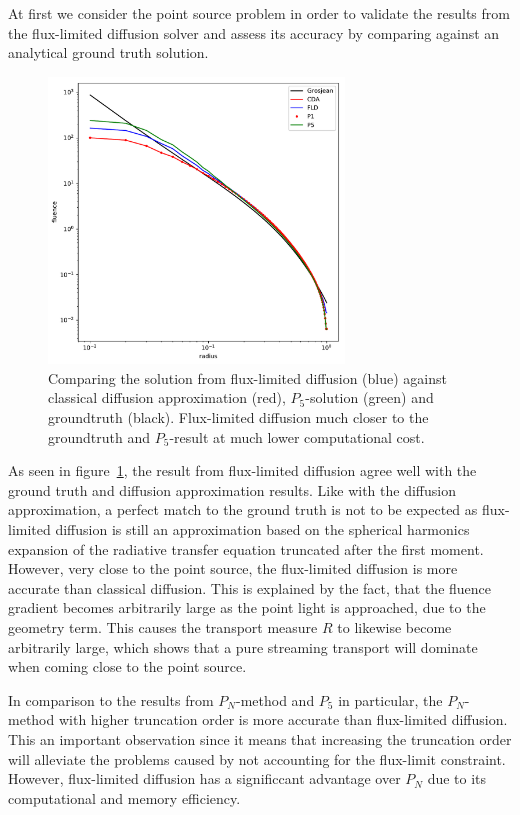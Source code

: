 At first we consider the point source problem in order to validate the results from the flux-limited diffusion solver and assess its accuracy by comparing against an analytical ground truth solution.
\begin{figure}[h]
\centering
\includegraphics[width=0.7\textwidth]{06_fld/results/fld_result_plot_pointsource.pdf}
\caption{Comparing the solution from flux-limited diffusion (blue) against classical diffusion approximation (red), $P_5$-solution (green) and groundtruth (black). Flux-limited diffusion much closer to the groundtruth and $P_5$-result at much lower computational cost.}
\label{fig:fld_results_pointsource_1}
\end{figure}
As seen in figure~\ref{fig:fld_results_pointsource_1}, the result from flux-limited diffusion agree well with the ground truth and diffusion approximation results. Like with the diffusion approximation, a perfect match to the ground truth is not to be expected as flux-limited diffusion is still an approximation based on the spherical harmonics expansion of the radiative transfer equation truncated after the first moment. However, very close to the point source, the flux-limited diffusion is more accurate than classical diffusion. This is explained by the fact, that the fluence gradient becomes arbitrarily large as the point light is approached, due to the geometry term. This causes the transport measure $R$ to likewise become arbitrarily large, which shows that a pure streaming transport will dominate when coming close to the point source.

In comparison to the results from $P_N$-method and $P_5$ in particular, the $P_N$-method with higher truncation order is more accurate than flux-limited diffusion. This an important observation since it means that increasing the truncation order will alleviate the problems caused by not accounting for the flux-limit constraint. However, flux-limited diffusion has a significcant advantage over $P_N$ due to its computational and memory efficiency.

